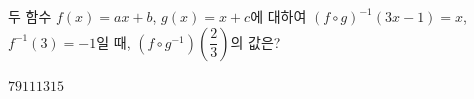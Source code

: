 두 함수 $f(x)=ax+b$, $g(x)=x+c$에 대하여 $(f\circ g)^{-1}(3x-1)=x$, $f^{-1}(3)=-1$일 때, $(f\circ g^{-1})\!\left(\dfrac{2}{3}\right)$의 값은? 
\begin{choices32}{$7$}{$9$}{$11$}{$13$}{$15$}\end{choices32}
